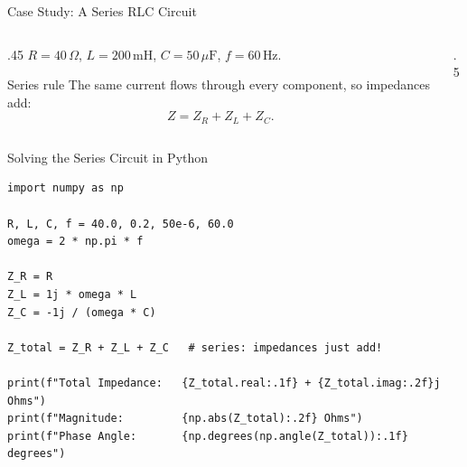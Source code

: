 \documentclass[9pt,aspectratio=169,xcolor=table]{beamer}
\begin{document}
\begin{frame}{Case Study: A Series RLC Circuit}
    \leavevmode
    \begin{columns}[c]
        \begin{column}{.45\textwidth}
            $R = 40\,\Omega$, $L = 200\,\text{mH}$,
            $C = 50\,\mu\text{F}$, $f = 60\,\text{Hz}$.

            \vspace{2mm}
            \begin{block}{Series rule}
                The same current flows through every component, so
                impedances \alert{add}:
                \[
                Z = Z_R + Z_L + Z_C.
                \]
            \end{block}
        \end{column}
        \begin{column}{.5\textwidth}
        \end{column}
    \end{columns}
\end{frame}

\begin{frame}[fragile]{Solving the Series Circuit in Python}
    \leavevmode
\begin{lstlisting}
import numpy as np

R, L, C, f = 40.0, 0.2, 50e-6, 60.0
omega = 2 * np.pi * f

Z_R = R
Z_L = 1j * omega * L
Z_C = -1j / (omega * C)

Z_total = Z_R + Z_L + Z_C   # series: impedances just add!

print(f"Total Impedance:   {Z_total.real:.1f} + {Z_total.imag:.2f}j Ohms")
print(f"Magnitude:         {np.abs(Z_total):.2f} Ohms")
print(f"Phase Angle:       {np.degrees(np.angle(Z_total)):.1f} degrees")
\end{lstlisting}
\end{frame}
\end{document}
